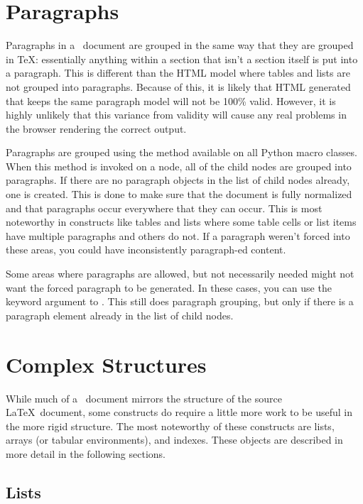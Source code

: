 \section{Paragraphs\label{sec:paragraphs}}

Paragraphs in a \plasTeX\ document are grouped in the same way that they
are grouped in \TeX: essentially anything within a section that isn't a
section itself is put into a paragraph.  This is different than the HTML
model where tables and lists are not grouped into paragraphs.  Because
of this, it is likely that HTML generated that keeps the same paragraph
model will not be 100\% valid.  However, it is highly unlikely that this 
variance from validity will cause any real problems in the browser 
rendering the correct output.

Paragraphs are grouped using the  method available on
all Python macro classes.  When this method is invoked on a node, 
all of the child nodes are grouped into paragraphs.  If there are no
paragraph objects in the list of child nodes already, one is created.
This is done to make sure that the document is fully normalized and 
that paragraphs occur everywhere that they can occur.  This is
most noteworthy in constructs like tables and lists where some table cells
or list items have multiple paragraphs and others do not.  If a paragraph
weren't forced into these areas, you could have inconsistently 
paragraph-ed content.

Some areas where paragraphs are allowed, but not necessarily needed might
not want the forced paragraph to be generated.  In these cases, you can
use the  keyword argument to .
This still does paragraph grouping, but only if there is a paragraph element
already in the list of child nodes.


\section{Complex Structures\label{sec:complexdoc}}

While much of a \plasTeX\ document mirrors the structure of the source
\LaTeX\ document, some constructs do require a little more work to be
useful in the more rigid structure.  The most noteworthy of these 
constructs are lists, arrays (or tabular environments), and indexes.  
These objects are described in more detail in the following sections.


\subsection{Lists\label{sec:lists}}

